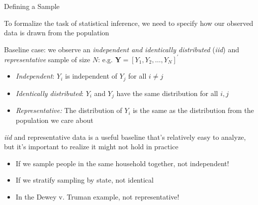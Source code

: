 \documentclass[11pt,english,handout]{beamer}
\newenvironment{wideitemize}{\itemize\addtolength{\itemsep}{10pt}}{\enditemize}
\begin{document}
\begin{frame}{Defining a Sample}
	\begin{wideitemize}	
	
	\item
	To formalize the task of statistical inference, we need to specify how our observed data is drawn from the population
	
	\pause{}
	

	\item Baseline case: we observe an \emph{independent and identically distributed} (\emph{iid}) and  \textit{representative }sample of size $N$: e.g. $\mathbf{Y}=[Y_{1},Y_{2},\dots,Y_{N}]^\prime$
	
	\pause{}\smallskip
\begin{itemize}
	\item \emph{Independent}: $Y_i$ is independent of $Y_j$ for all $i\neq j$
	
\smallskip
	\pause{}
	\item \emph{Identically distributed}: $Y_i$ and $Y_j$ have the same distribution for all $i,j$

\pause{}
\smallskip
	\item
	\emph{Representative:} The distribution of $Y_i$ is the same as the distribution from the population we care about
	
\end{itemize}		
	\pause	
	\item	
	\emph{iid} and representative data is a useful baseline that's relatively easy to analyze, but it's important to realize it might not hold in practice
		\begin{itemize}
			\pause
\smallskip
			\item
			If we sample people in the same household together, not independent! 
		
\smallskip	
			\pause
			\item
			If we stratify sampling by state, not identical 
			\pause

\smallskip
			\item 
			In the Dewey v. Truman example, not representative! 
		\end{itemize}
	\end{wideitemize}

\end{frame}
\end{document}

